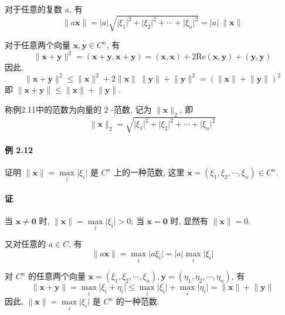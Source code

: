 \par 对于任意的复数 $a$, 有
$$
    \lVert a\bm{x} \rVert = \lvert a \rvert\sqrt{\lvert \xi_1 \rvert^2 + \lvert \xi_2 \rvert^2 + \cdots + \lvert \xi_n \rvert^2} = \lvert a \rvert \ \lVert \bm{x} \rVert
$$
\par 对于任意两个向量 $\bm{x}, \bm{y} \in C^n$, 有
$$
    \lVert \bm{x} + \bm{y} \rVert^2 = (\bm{x} + \bm{y}, \bm{x} + \bm{y}) = (\bm{x}, \bm{x}) + 2\mathrm{Re}(\bm{x}, \bm{y}) + (\bm{y}, \bm{y})
$$
因此,
$$
    \lVert \bm{x} + \bm{y} \rVert^2 \leqslant \lVert \bm{x} \rVert^2 + 2\lVert \bm{x} \rVert \ \lVert\bm{y} \rVert + \lVert \bm{y} \rVert^2 = (\lVert \bm{x} \rVert+ \lVert\bm{y} \rVert)^2
$$
即 $\lVert \bm{x} + \bm{y} \rVert \leqslant \lVert \bm{x} \rVert + \lVert \bm{y} \rVert$.

\par 称例2.11中的范数为向量的 $2$ -范数, 记为 $\lVert \bm{x} \rVert _2$, 即
\begin{equation}
    \lVert \bm{x} \rVert _2 = \sqrt{\lvert \xi_1 \rvert^2 + \lvert \xi_2 \rvert^2 + \cdots + \lvert \xi_n \rvert^2}
    \tag{2.2.1}
\end{equation}

\paragraph*{例 2.12} 证明 $\lVert \bm{x} \rVert = \mathop{\max}\limits_{i} \lvert \xi_i \rvert$ 是 $C^n$ 上的一种范数, 这里 $\bm{x} = (\xi_1, \xi_2, \cdots, \xi_n) \in C^n$.

\paragraph*{证} 当 $\bm{x} \neq \bm{0}$ 时, $\lVert \bm{x} \rVert = \mathop{\max}\limits_{i} \lvert \xi_i \rvert > 0$; 当 $\bm{x} = \bm{0}$ 时, 显然有 $\lVert \bm{x} \rVert = 0$.
\par 又对任意的 $a \in C$, 有
\begin{equation*}
    \lVert a\bm{x} \rVert = \mathop{\max}_{i} \lvert a\xi_i \rvert = \lvert a \rvert \mathop{\max}_{i} \lvert \xi_i\rvert
\end{equation*}
\par 对 $C^n$ 的任意两个向量 $\bm{x} = (\xi_1, \xi_2, \cdots, \xi_n), \bm{y} = (\eta_1, \eta_2, \cdots, \eta_n)$, 有
$$
    \lVert \bm{x} + \bm{y} \rVert = \mathop{\max}_{i} \lvert \xi_i + \eta_i \rvert \leqslant \mathop{\max}\limits_{i} \lvert \xi_i \rvert + \mathop{\max}\limits_{i} \lvert \eta_i \rvert = \lVert \bm{x} \rVert + \lVert \bm{y} \rVert
$$
因此, $\lVert \bm{x} \rVert = \mathop{\max}\limits_{i} \lvert \xi_i \rvert$ 是 $C^n$ 的一种范数.

